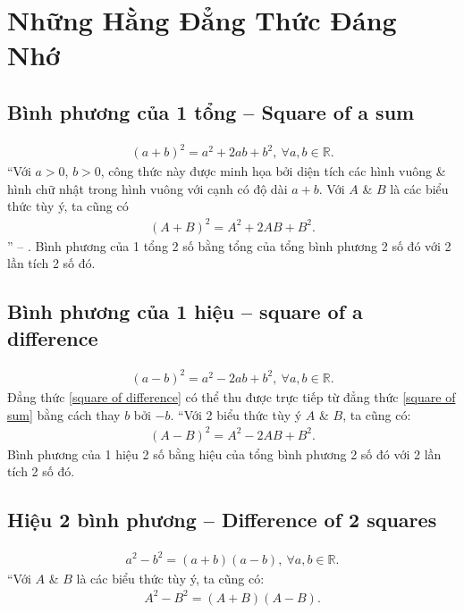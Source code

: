 \documentclass[oneside]{book}
\numberwithin{equation}{section}
\begin{document}
\section{Những Hằng Đẳng Thức Đáng Nhớ}

\subsection{Bình phương của 1 tổng -- Square of a sum}
\begin{align}
	\label{square of sum}
	\tag{sos}
	(a + b)^2 = a^2 + 2ab + b^2,\ \forall a,b\in\mathbb{R}.
\end{align}
``Với $a > 0$, $b > 0$, công thức này được minh họa bởi diện tích các hình vuông \& hình chữ nhật trong hình vuông với cạnh có độ dài $a + b$. Với $A$ \& $B$ là các biểu thức tùy ý, ta cũng có
\begin{align*}
	(A + B)^2 = A^2 + 2AB + B^2.
\end{align*}
'' -- \cite[p. 9]{SGK_Toan_8_tap_1}. Bình phương của 1 tổng 2 số bằng tổng của tổng bình phương 2 số đó với 2 lần tích 2 số đó.

\subsection{Bình phương của 1 hiệu -- square of a difference}
\begin{align}
	\label{square of difference}
	\tag{sod}
	(a - b)^2 = a^2 - 2ab + b^2,\ \forall a,b\in\mathbb{R}.
\end{align}
Đẳng thức \eqref{square of difference} có thể thu được trực tiếp từ đẳng thức \eqref{square of sum} bằng cách thay $b$ bởi $-b$. ``Với 2 biểu thức tùy ý $A$ \& $B$, ta cũng có:
\begin{align*}
	(A - B)^2 = A^2 - 2AB + B^2.
\end{align*}
Bình phương của 1 hiệu 2 số bằng hiệu của tổng bình phương 2 số đó với 2 lần tích 2 số đó. 

\subsection{Hiệu 2 bình phương -- Difference of 2 squares}
\begin{align}
	a^2 - b^2 = (a + b)(a - b),\ \forall a,b\in\mathbb{R}.
\end{align}
``Với $A$ \& $B$ là các biểu thức tùy ý, ta cũng có:
\begin{align}
	A^2 - B^2 = (A + B)(A - B).
\end{align}
\end{document}
